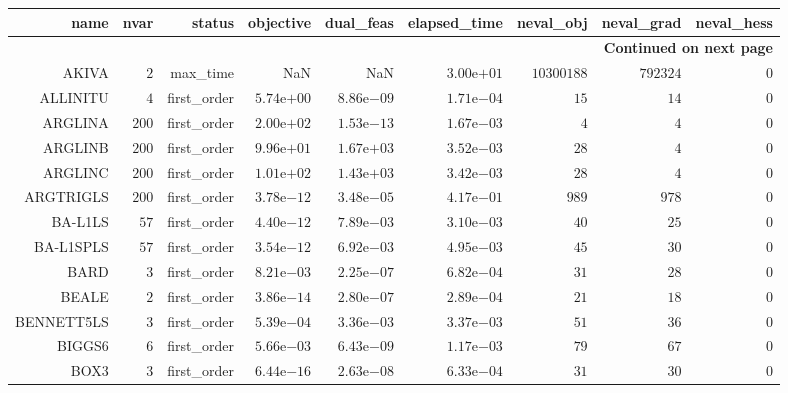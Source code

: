 \begin{longtable}{rrrrrrrrr}
\hline
name & nvar & status & objective & dual\_feas & elapsed\_time & neval\_obj & neval\_grad & neval\_hess \\\hline
\endhead
\hline
\multicolumn{9}{r}{{\bfseries Continued on next page}}\\
\hline
\endfoot
\endlastfoot
AKIVA & \(     2\) & max\_time &       NaN &       NaN & \( 3.00\)e\(+01\) & \(10300188\) & \(792324\) & \(     0\) \\
ALLINITU & \(     4\) & first\_order & \( 5.74\)e\(+00\) & \( 8.86\)e\(-09\) & \( 1.71\)e\(-04\) & \(    15\) & \(    14\) & \(     0\) \\
ARGLINA & \(   200\) & first\_order & \( 2.00\)e\(+02\) & \( 1.53\)e\(-13\) & \( 1.67\)e\(-03\) & \(     4\) & \(     4\) & \(     0\) \\
ARGLINB & \(   200\) & first\_order & \( 9.96\)e\(+01\) & \( 1.67\)e\(+03\) & \( 3.52\)e\(-03\) & \(    28\) & \(     4\) & \(     0\) \\
ARGLINC & \(   200\) & first\_order & \( 1.01\)e\(+02\) & \( 1.43\)e\(+03\) & \( 3.42\)e\(-03\) & \(    28\) & \(     4\) & \(     0\) \\
ARGTRIGLS & \(   200\) & first\_order & \( 3.78\)e\(-12\) & \( 3.48\)e\(-05\) & \( 4.17\)e\(-01\) & \(   989\) & \(   978\) & \(     0\) \\
BA-L1LS & \(    57\) & first\_order & \( 4.40\)e\(-12\) & \( 7.89\)e\(-03\) & \( 3.10\)e\(-03\) & \(    40\) & \(    25\) & \(     0\) \\
BA-L1SPLS & \(    57\) & first\_order & \( 3.54\)e\(-12\) & \( 6.92\)e\(-03\) & \( 4.95\)e\(-03\) & \(    45\) & \(    30\) & \(     0\) \\
BARD & \(     3\) & first\_order & \( 8.21\)e\(-03\) & \( 2.25\)e\(-07\) & \( 6.82\)e\(-04\) & \(    31\) & \(    28\) & \(     0\) \\
BEALE & \(     2\) & first\_order & \( 3.86\)e\(-14\) & \( 2.80\)e\(-07\) & \( 2.89\)e\(-04\) & \(    21\) & \(    18\) & \(     0\) \\
BENNETT5LS & \(     3\) & first\_order & \( 5.39\)e\(-04\) & \( 3.36\)e\(-03\) & \( 3.37\)e\(-03\) & \(    51\) & \(    36\) & \(     0\) \\
BIGGS6 & \(     6\) & first\_order & \( 5.66\)e\(-03\) & \( 6.43\)e\(-09\) & \( 1.17\)e\(-03\) & \(    79\) & \(    67\) & \(     0\) \\
BOX3 & \(     3\) & first\_order & \( 6.44\)e\(-16\) & \( 2.63\)e\(-08\) & \( 6.33\)e\(-04\) & \(    31\) & \(    30\) & \(     0\) \\

\end{longtable}
